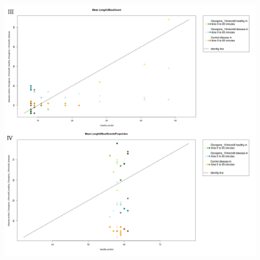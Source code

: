 \begin{figure}[h!]
\begin{center}
\includegraphics[width=15cm,height=17cm]{PTZCountScootsC.png}
\end{center}
\end{figure}
\newpage
